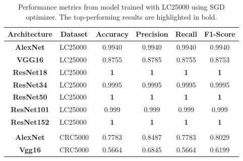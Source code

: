 \begin{table}[t!]
\centering

\caption{Performance metrics from model trained with \gls{LC25000} using SGD optimizer. The top-performing results are highlighted in bold.}
\label{table_lc25000_sgd}

\begin{tabular}{|c|l|c|c|c|c|}
\hline
\textbf{Architecture} & \multicolumn{1}{c|}{\textbf{Dataset}}          & \textbf{Accuracy} & \textbf{Precision} & \textbf{Recall} & \textbf{F1-Score} \\ \hline
\textbf{AlexNet}      & LC25000                                        & 0.9940       & 0.9940             & 0.9940          & 0.9940            \\ \hline
\textbf{VGG16}        & LC25000                                        & 0.8755       & 0.8785             & 0.8755          & 0.8753            \\ \hline
\textbf{ResNet18}     & LC25000                                        & \textbf{1}            & \textbf{1}                  & \textbf{1}               & \textbf{1}                 \\ \hline
\textbf{ResNet34}     & LC25000                                        & 0.9995       & 0.9995             & 0.9995          & 0.9995            \\ \hline
\textbf{ResNet50}     & LC25000                                        & \textbf{1}            & \textbf{1}                  & \textbf{1}               & \textbf{1}                 \\ \hline
\textbf{ResNet101}    & LC25000                                        & 0.999        & 0.999              & 0.999           & 0.999             \\ \hline
\textbf{ResNet152}    & LC25000                                        & \textbf{1}            & \textbf{1}                  & \textbf{1}               & \textbf{1}                 \\ \hline
\multicolumn{1}{|l|}{} &                                       & \multicolumn{1}{l|}{} & \multicolumn{1}{l|}{} & \multicolumn{1}{l|}{} & \multicolumn{1}{l|}{} \\ \hline
\textbf{AlexNet}      & CRC5000                                         & 0.7783        & 0.8487              & 0.7783           & 0.8029             \\ \hline
\textbf{Vgg16}        &CRC5000                                           & 0.5664        & 0.6845              & 0.5664           & 0.6199             \\ \hline

\end{tabular}
\end{table}
